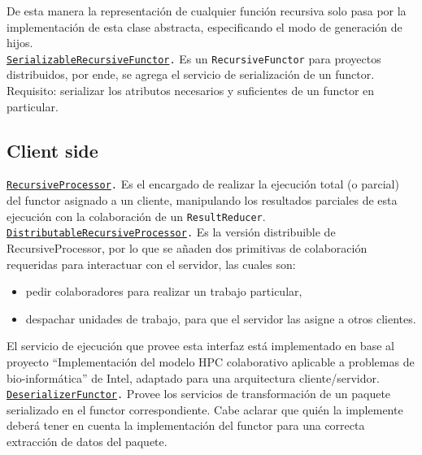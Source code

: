 \documentclass[a4paper,12pt,twoside]{article}
\begin{document}
        De esta manera la representación de cualquier función recursiva solo pasa por la implementación de esta clase abstracta, 
        especificando el modo de generación de hijos.\\

        \texttt{\underline{SerializableRecursiveFunctor}.}
        Es un \texttt{RecursiveFunctor} para proyectos distribuidos, por ende, se agrega el servicio de serialización de un functor. 
        Requisito: serializar los atributos necesarios y suficientes de un functor en particular.
    
    
    \subsection{Client side}
        
        \texttt{\underline{RecursiveProcessor}.}
        Es el encargado de realizar la ejecución total (o parcial) del functor asignado a un cliente, manipulando los resultados parciales 
        de esta ejecución con la colaboración de un \texttt{ResultReducer}.\\ 
            
        \texttt{\underline{DistributableRecursiveProcessor}.}
        Es la versión distribuible de RecursiveProcessor, por lo que se añaden dos primitivas de colaboración requeridas para interactuar 
        con el servidor, las cuales son:
        \begin{itemize}
         \item pedir colaboradores para realizar un trabajo particular,
         \item despachar unidades de trabajo, para que el servidor las asigne a otros clientes.
        \end{itemize}
        El servicio de ejecución que provee esta interfaz está implementado en base al proyecto ``Implementación del modelo HPC colaborativo 
        aplicable a problemas de bio-informática'' de Intel, adaptado para una arquitectura cliente/servidor. \\

        \texttt{\underline{DeserializerFunctor}.}
        Provee los servicios de transformación de un paquete serializado en el functor correspondiente. Cabe aclarar que quién la implemente
        deberá tener en cuenta la implementación del functor para una correcta extracción de datos del paquete.
\end{document}
